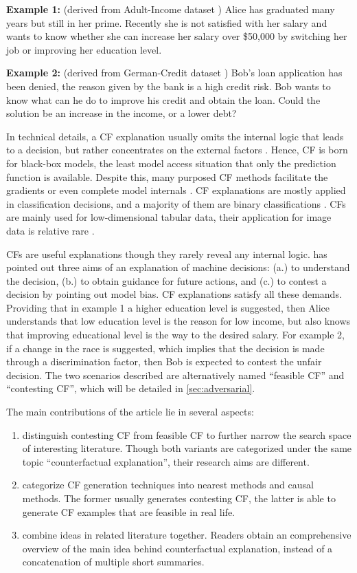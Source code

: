 \noindent \textbf{Example 1:} (derived from Adult-Income dataset \cite{AdultIncomeDataset}) Alice has graduated many years but still in her prime. Recently she is not satisfied with her salary and wants to know whether she can increase her salary over \$50,000 by switching her job or improving her education level.

\noindent \textbf{Example 2:} (derived from German-Credit dataset \cite{GermanCreditDataset}) Bob's loan application has been denied, the reason given by the bank is a high credit risk. Bob wants to know what can he do to improve his credit and obtain the loan. Could the solution be an increase in the income, or a lower debt?

In technical details, a CF explanation usually omits the internal logic that leads to a decision, but rather concentrates on the external factors \cite{watcher2017}. Hence, CF is born for black-box models, the least model access situation that only the prediction function is available. Despite this, many purposed CF methods facilitate the gradients or even complete model internals \cite{CFReview}. CF explanations are mostly applied in classification decisions, and a majority of them are binary classifications \cite{CFandAE}. CFs are mainly used for low-dimensional tabular data, their application for image data is relative rare \cite{CFandAE}.

CFs are useful explanations though they rarely reveal any internal logic. \citeauthor{watcher2017} \cite{watcher2017} has pointed out three aims of an explanation of machine decisions: (a.) to understand the decision, (b.) to obtain guidance for future actions, and (c.) to contest a decision by pointing out model bias. CF explanations satisfy all these demands. Providing that in example 1 a higher education level is suggested, then Alice understands that low education level is the reason for low income, but also knows that improving educational level is the way to the desired salary. For example 2, if a change in the race is suggested, which implies that the decision is made through a discrimination factor, then Bob is expected to contest the unfair decision. The two scenarios described are alternatively named ``feasible CF'' and ``contesting CF'', which will be detailed in \autoref{sec:adversarial}.

The main contributions of the article lie in several aspects:
\begin{enumerate}
  \item distinguish contesting CF from feasible CF to further narrow the search space of interesting literature. Though both variants are categorized under the same topic ``counterfactual explanation'', their research aims are different.
  \item categorize CF generation techniques into nearest methods and causal methods. The former usually generates contesting CF, the latter is able to generate CF examples that are feasible in real life.
  \item combine ideas in related literature together. Readers obtain an comprehensive overview of the main idea behind counterfactual explanation, instead of a concatenation of multiple short summaries.
\end{enumerate}

